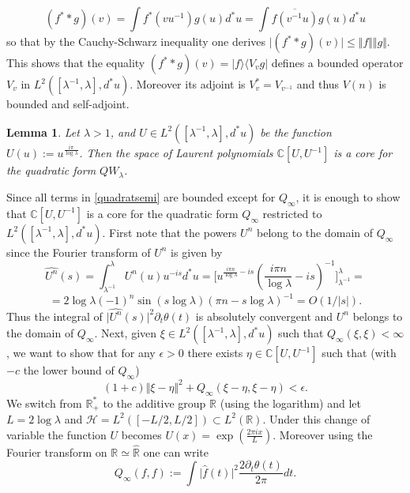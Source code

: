 \documentclass[cupthm]{CUP-JNL-JMJ}
\def\C{{\mathbb C}}
\def\R{{\mathbb R}}
\def\cH{{\mathcal H}}
\numberwithin{equation}{section}
\theoremstyle{cupplain}
\newtheorem{lemma}[theorem]{Lemma}
\theoremstyle{cupdefinition}
\theoremstyle{cupremark}
\theoremstyle{cupproof}
\begin{document}
  $$
  (f^**g)(v)=\int f^*(vu^{-1})g(u)d^*u= \int \overline{f(v^{-1}u)}g(u)d^*u
  $$
  so that by the Cauchy-Schwarz inequality one derives $\vert(f^**g)(v)\vert\leq \Vert f\Vert \Vert g\Vert$. This shows that the equality  $(f^**g)(v)=\vert f\rangle \langle V_vg\vert$ defines a bounded operator $V_v$ in $L^2([\lambda^{-1},\lambda],d^*u)$. Moreover its adjoint is $V_v^*=V_{v^{-1}}$ and thus $V(n)$ is bounded and self-adjoint. \endproof 
  \begin{lemma}\label{core}  Let $\lambda>1$, and $U\in L^2([\lambda^{-1},\lambda],d^*u)$ be the function $U(u):=u^{\frac{i\pi }{\log \lambda}}$. Then the space of Laurent polynomials $\C[U,U^{-1}]$ is a core for the quadratic form $QW_\lambda$.  	
  \end{lemma}
  \proof  Since all terms in \eqref{quadratsemi} are bounded except for $Q_\infty$, it is enough to show that $\C[U,U^{-1}]$ is a core for the quadratic form $Q_\infty$ restricted to $L^2([\lambda^{-1},\lambda],d^*u)$. First note that the powers $U^n$ belong to the domain of
  $Q_\infty$ since the Fourier transform of $U^n$ is given by
  $$
 \widehat{U^n}(s)= \int_{\lambda^{-1}}^\lambda U^n(u)u^{-is}d^*u=\Big[u^{\frac{i\pi n}{\log \lambda}-is}\left(\frac{i\pi n}{\log \lambda}-is\right)^{-1}\Big]_{\lambda^{-1}}^\lambda=
 $$ 
  \begin{equation}\label{quadratsemi3.5}
 =2 \log \lambda (-1)^n \sin(s\log \lambda)\left(\pi n -s\log \lambda\right)^{-1}=O(1/\vert s\vert).
  \end{equation}
  \newline
  Thus the integral of  $\vert\widehat{U^n}(s)\vert^2 \partial_t\theta(t)$ is absolutely convergent and $U^n$ belongs to the domain of
  $Q_\infty$. 
    Next, given $\xi\in L^2([\lambda^{-1},\lambda],d^*u)$ such that $Q_\infty(\xi,\xi)<\infty$, we want to show that for any $\epsilon>0$ there exists $\eta \in \C[U,U^{-1}]$ such that (with $-c$ the lower bound of $Q_\infty$)
  \begin{equation}\label{quadratsemi2}
  (1+c)\Vert \xi-\eta\Vert^2 +Q_\infty(\xi-\eta,\xi-\eta)<\epsilon.
\end{equation}
  We switch from $\R_+^*$ to the additive group $\R$ (using the logarithm) and let $L=2\log \lambda$ and $\cH= L^2([-L/2,L/2])\subset L^2(\R)$. Under this change of variable the function $U$ becomes $U(x)=\exp(\frac{2\pi i x}{L})$. Moreover using the Fourier transform on $\R\simeq \widehat \R$ one can write
    \begin{equation}\label{quadratsemi3}
  Q_\infty(f,f):=\int 
\vert{\widehat f}(t)\vert^2\frac{2\partial_t\theta(t)}{2 \pi}dt.
\end{equation}
\end{document}
